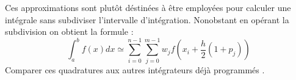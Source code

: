 \begin{enumerate}
\begin{center}
\begin{tabular}{ccc}
\end{tabular}
\end{center}
Ces approximations sont plutôt déstinées à être employées pour calculer une intégrale sans subdiviser l'intervalle d'intégration. Nonobstant en opérant la subdivision 
on obtient la formule : 
\begin{equation}
\int_a^b f(x)dx \simeq \sum_{i=0}^{n-1} \sum_{j=0}^{m-1} w_j f(x_i+\frac{h}{2}(1+p_j))
\end{equation}
Comparer ces quadratures aux autres intégrateurs déjà programmés .

 



\end{enumerate}

